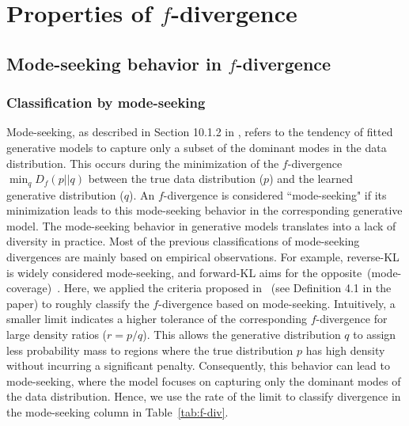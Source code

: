 \section{Properties of $f$-divergence}

\label{app:property}

\subsection{Mode-seeking behavior in $f$-divergence}

\subsubsection{Classification by mode-seeking}
Mode-seeking, as described in Section 10.1.2 in \cite{Bishop2006PatternRA}, refers to the tendency of fitted generative models to capture only a subset of the dominant modes in the data distribution. This occurs during the minimization of the $f$-divergence $\min_q D_f(p||q)$ between the true data distribution ($p$) and the learned generative distribution ($q$).  An $f$-divergence is considered ``mode-seeking" if its minimization leads to this mode-seeking behavior in the corresponding generative model. The mode-seeking behavior in generative models translates into a lack of diversity in practice. Most of the previous classifications of mode-seeking divergences are mainly based on empirical observations. For example, reverse-KL is widely considered mode-seeking, and forward-KL aims for the opposite~(\ie mode-coverage)~\cite{Poole2016ImprovedGO}. Here, we applied the criteria proposed in \cite{pmlr-v206-ting-li23a}~(see Definition 4.1 in the paper) to roughly classify the $f$-divergence based on mode-seeking. Intuitively, a smaller limit indicates a higher tolerance of the corresponding $f$-divergence for large density ratios ($r=p/q$). This allows the generative distribution $q$ to assign less probability mass to regions where the true distribution $p$ has high density without incurring a significant penalty. Consequently, this behavior can lead to mode-seeking, where the model focuses on capturing only the dominant modes of the data distribution. Hence, we use the rate of the limit to classify divergence in the mode-seeking column in Table~\ref{tab:f-div}.


